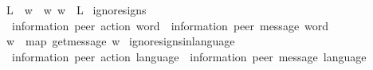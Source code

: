 \begin{isabellebody}
\ \ {\isachardoublequoteopen}L{\isasymdownharpoonright}\isactrlsub {\isacharquery}{\kern0pt}\ {\isasymequiv}\ {\isacharbraceleft}{\kern0pt}w{\isasymdown}\isactrlsub {\isacharquery}{\kern0pt}\ {\isacharbar}{\kern0pt}\ w{\isachardot}{\kern0pt}\ w\ {\isasymin}\ L{\isacharbraceright}{\kern0pt}{\isachardoublequoteclose}\isanewline
\isanewline
{}\isamarkupfalse%
\ ignore{\isacharunderscore}{\kern0pt}signs\isanewline
\ \ {\isacharcolon}{\kern0pt}{\isacharcolon}{\kern0pt}\ {\isachardoublequoteopen}{\isacharparenleft}{\kern0pt}{\isacharprime}{\kern0pt}information{\isacharcomma}{\kern0pt}\ {\isacharprime}{\kern0pt}peer{\isacharparenright}{\kern0pt}\ action\ word\ {\isasymRightarrow}\ {\isacharparenleft}{\kern0pt}{\isacharprime}{\kern0pt}information{\isacharcomma}{\kern0pt}\ {\isacharprime}{\kern0pt}peer{\isacharparenright}{\kern0pt}\ message\ word{\isachardoublequoteclose}\ \ {\isacharparenleft}{\kern0pt}{\isachardoublequoteopen}{\isacharunderscore}{\kern0pt}{\isasymdown}\isactrlsub {\isacharbang}{\kern0pt}\isactrlsub {\isacharquery}{\kern0pt}{\isachardoublequoteclose}\ {\isacharbrackleft}{\kern0pt}{}{}{\isacharbrackright}{\kern0pt}\ {}{}{}{\isacharparenright}{\kern0pt}\isanewline
\ \ \isanewline
\ \ {\isachardoublequoteopen}w{\isasymdown}\isactrlsub {\isacharbang}{\kern0pt}\isactrlsub {\isacharquery}{\kern0pt}\ {\isasymequiv}\ map\ get{\isacharunderscore}{\kern0pt}message\ w{\isachardoublequoteclose}\isanewline
\isanewline
{}\isamarkupfalse%
\ ignore{\isacharunderscore}{\kern0pt}signs{\isacharunderscore}{\kern0pt}in{\isacharunderscore}{\kern0pt}language\isanewline
\ \ {\isacharcolon}{\kern0pt}{\isacharcolon}{\kern0pt}\ {\isachardoublequoteopen}{\isacharparenleft}{\kern0pt}{\isacharprime}{\kern0pt}information{\isacharcomma}{\kern0pt}\ {\isacharprime}{\kern0pt}peer{\isacharparenright}{\kern0pt}\ action\ language\ {\isasymRightarrow}\ {\isacharparenleft}{\kern0pt}{\isacharprime}{\kern0pt}information{\isacharcomma}{\kern0pt}\ {\isacharprime}{\kern0pt}peer{\isacharparenright}{\kern0pt}\ message\ language{\isachardoublequoteclose}\isanewline
\ \ \ \ \ {\isacharparenleft}{\kern0pt}{\isachardoublequoteopen}{\isacharunderscore}{\kern0pt}{\isasymdownharpoonright}\isactrlsub {\isacharbang}{\kern0pt}\isactrlsub {\isacharquery}{\kern0pt}{\isachardoublequoteclose}\ {\isacharbrackleft}{\kern0pt}{}{}{\isacharbrackright}{\kern0pt}\ {}{}{}{\isacharparenright}{\kern0pt}\ \isanewline

\end{isabellebody}
